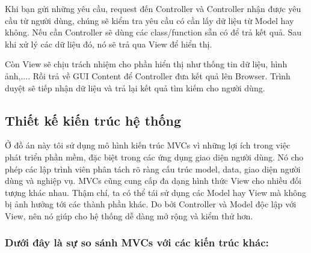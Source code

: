 Khi bạn gửi những yêu cầu, request đến Controller và Controller nhận được yêu cầu từ người dùng, chúng sẽ kiểm tra yêu cầu có cần lấy dữ liệu từ Model hay không. Nếu cần Controller sẽ dùng các class/function sẵn có để trả kết quả. Sau khi xử lý các dữ liệu đó, nó sẽ trả qua View để hiển thị.

Còn View sẽ chịu trách nhiệm cho phần hiển thị như thống tin dữ liệu, hình ảnh,.... Rồi trả về GUI Content để Controller đưa kết quả lên Browser. Trình duyệt sẽ tiếp nhận dữ liệu và trả lại kết quả tìm kiếm cho người dùng.

\subsection{Thiết kế kiến trúc hệ thống}

Ở đồ án này tôi sử dụng mô hình kiến trúc MVCs vì những lợi ích trong việc phát triển phần mềm, đặc biệt trong các ứng dụng giao diện người dùng. Nó cho phép các lập trình viên phân tách rõ ràng cấu trúc model, data, giao diện người dùng và nghiệp vụ. MVCs cũng cung cấp đa dạng hình thức View cho nhiều đối tượng khác nhau. Thậm chí, ta có thể tái sử dụng các Model hay View mà không bị ảnh hưởng tới các thành phần khác. Do bởi Controller và Model độc lập với View, nên nó giúp cho hệ thống dễ dàng mở rộng và kiểm thử hơn.

\subsubsection{Dưới đây là sự so sánh MVCs với các kiến trúc khác:}


